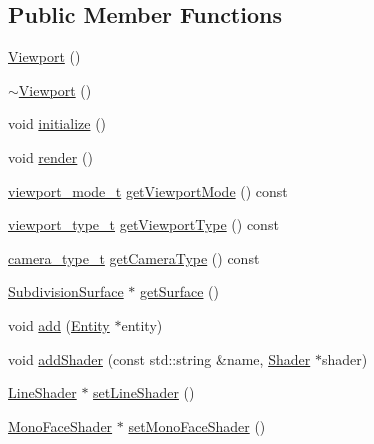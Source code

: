 \subsection*{Public Member Functions}
\begin{DoxyCompactItemize}
\item 
\hyperlink{classShipCADGeometry_1_1Viewport_a9fde8f966d9802dd42254acf0ed05386}{Viewport} ()
\item 
\hyperlink{classShipCADGeometry_1_1Viewport_a1e18a1ff4a52be33ef63d25034561850}{$\sim$\-Viewport} ()
\item 
void \hyperlink{classShipCADGeometry_1_1Viewport_a9c35de3f7c9d7c860c494081b48309b3}{initialize} ()
\item 
void \hyperlink{classShipCADGeometry_1_1Viewport_a9e81b526db3c2b508322c29b9fda5845}{render} ()
\item 
\hyperlink{classShipCADGeometry_1_1Viewport_a32872391303d6fbcc5766df64933cc14}{viewport\-\_\-mode\-\_\-t} \hyperlink{classShipCADGeometry_1_1Viewport_a3f5111023ade781b39ded6f4291e3a2f}{get\-Viewport\-Mode} () const 
\item 
\hyperlink{classShipCADGeometry_1_1Viewport_a97a32c07745357d09b8f282c69ea9199}{viewport\-\_\-type\-\_\-t} \hyperlink{classShipCADGeometry_1_1Viewport_ae11edc98f0eeae8adfaf7dec4f287f5f}{get\-Viewport\-Type} () const 
\item 
\hyperlink{classShipCADGeometry_1_1Viewport_ae11090e9e924e7014fdff5111cb93810}{camera\-\_\-type\-\_\-t} \hyperlink{classShipCADGeometry_1_1Viewport_ab589b68a7ad44e568d6b759d9af3aad5}{get\-Camera\-Type} () const 
\item 
\hyperlink{classShipCADGeometry_1_1SubdivisionSurface}{Subdivision\-Surface} $\ast$ \hyperlink{classShipCADGeometry_1_1Viewport_a9370f2d60910e34a90588e2db577c132}{get\-Surface} ()
\item 
void \hyperlink{classShipCADGeometry_1_1Viewport_a3626f44e62e08918de5939970cdc531c}{add} (\hyperlink{classShipCADGeometry_1_1Entity}{Entity} $\ast$entity)
\item 
void \hyperlink{classShipCADGeometry_1_1Viewport_a886ac5965b63039799827da89bf3de20}{add\-Shader} (const std\-::string \&name, \hyperlink{classShipCADGeometry_1_1Shader}{Shader} $\ast$shader)
\item 
\hyperlink{classShipCADGeometry_1_1LineShader}{Line\-Shader} $\ast$ \hyperlink{classShipCADGeometry_1_1Viewport_a0720a01f8650dc4acf89aad0649d9196}{set\-Line\-Shader} ()
\item 
\hyperlink{classShipCADGeometry_1_1MonoFaceShader}{Mono\-Face\-Shader} $\ast$ \hyperlink{classShipCADGeometry_1_1Viewport_a5f3c02f4e24d614d4340816d6de50b0b}{set\-Mono\-Face\-Shader} ()
\end{DoxyCompactItemize}
